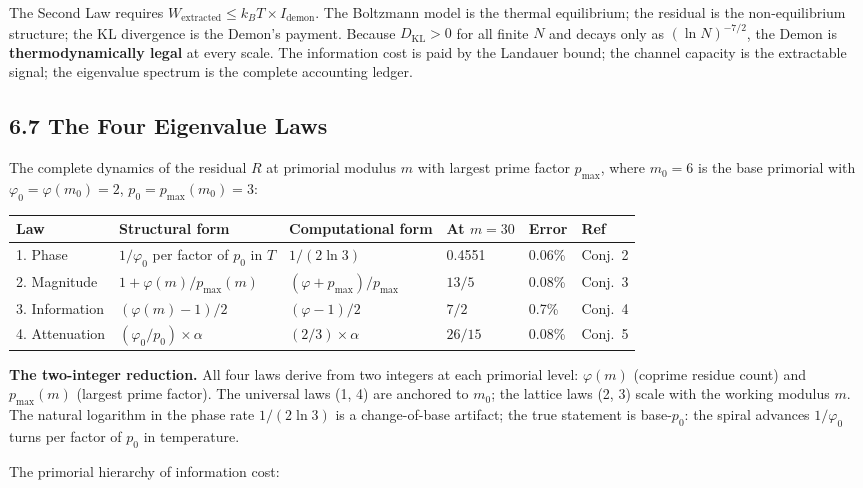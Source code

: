 \documentclass[
  11pt,
]{article}
\numberwithin{equation}{section}
\begin{document}
The Second Law requires
\(W_{\text{extracted}} \le k_B T \times I_{\text{demon}}\). The
Boltzmann model is the thermal equilibrium; the residual is the
non-equilibrium structure; the KL divergence is the Demon's payment.
Because \(D_{\text{KL}} > 0\) for all finite \(N\) and decays only as
\((\ln N)^{-7/2}\), the Demon is \textbf{thermodynamically legal} at
every scale. The information cost is paid by the Landauer bound; the
channel capacity is the extractable signal; the eigenvalue spectrum is
the complete accounting ledger.

\subsection{6.7 The Four Eigenvalue
Laws}\label{the-four-eigenvalue-laws}

The complete dynamics of the residual \(R\) at primorial modulus \(m\)
with largest prime factor \(p_{\max}\), where \(m_0 = 6\) is the base
primorial with \(\varphi_0 = \varphi(m_0) = 2\),
\(p_0 = p_{\max}(m_0) = 3\):

\begin{tabular}{@{}llllll@{}}
\toprule
Law & Structural form & Computational form & At \(m = 30\) & Error & Ref \\
\midrule
1. Phase & \(1/\varphi_0\) per factor of \(p_0\) in \(T\) &
\(1/(2\ln 3)\) & 0.4551 & 0.06\% & Conj.~2 \\
2. Magnitude & \(1 + \varphi(m)/p_{\max}(m)\) &
\((\varphi + p_{\max})/p_{\max}\) & \(13/5\) & 0.08\% & Conj.~3 \\
3. Information & \((\varphi(m) - 1)/2\) & \((\varphi - 1)/2\) &
\(7/2\) & 0.7\% & Conj.~4 \\
4. Attenuation & \((\varphi_0/p_0) \times \alpha\) &
\((2/3) \times \alpha\) & \(26/15\) & 0.08\% & Conj.~5 \\
\bottomrule
\end{tabular}

\textbf{The two-integer reduction.} All four laws derive from two
integers at each primorial level: \(\varphi(m)\) (coprime residue count)
and \(p_{\max}(m)\) (largest prime factor). The universal laws (1, 4)
are anchored to \(m_0\); the lattice laws (2, 3) scale with the working
modulus \(m\). The natural logarithm in the phase rate \(1/(2\ln 3)\) is
a change-of-base artifact; the true statement is base-\(p_0\): the
spiral advances \(1/\varphi_0\) turns per factor of \(p_0\) in
temperature.

The primorial hierarchy of information cost:
\end{document}
